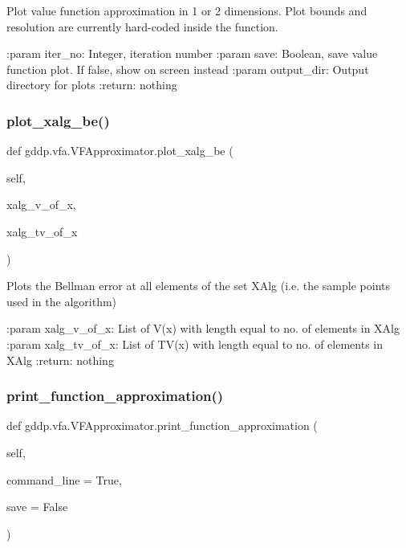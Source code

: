 \begin{DoxyVerb}Plot value function approximation in 1 or 2 dimensions. Plot bounds and resolution are
currently hard-coded inside the function.

:param iter_no: Integer, iteration number
:param save: Boolean, save value function plot. If false, show on screen instead
:param output_dir: Output directory for plots
:return: nothing
\end{DoxyVerb}
 \mbox{\label{classgddp_1_1vfa_1_1_v_f_approximator_a47860c0b82526ed12ecca7f058aaaa03}} 
\subsubsection{\texorpdfstring{plot\_xalg\_be()}{plot\_xalg\_be()}}
{\footnotesize\ttfamily def gddp.\+vfa.\+V\+F\+Approximator.\+plot\+\_\+xalg\+\_\+be (\begin{DoxyParamCaption}\item[{}]{self,  }\item[{}]{xalg\+\_\+v\+\_\+of\+\_\+x,  }\item[{}]{xalg\+\_\+tv\+\_\+of\+\_\+x }\end{DoxyParamCaption})}

\begin{DoxyVerb}Plots the Bellman error at all elements of the set XAlg (i.e. the sample points used in
the algorithm)

:param xalg_v_of_x: List of V(x) with length equal to no. of elements in XAlg
:param xalg_tv_of_x: List of TV(x) with length equal to no. of elements in XAlg
:return: nothing
\end{DoxyVerb}
 \mbox{\label{classgddp_1_1vfa_1_1_v_f_approximator_a6e8aef44abde4c6a1d2bce5474296143}} 
\subsubsection{\texorpdfstring{print\_function\_approximation()}{print\_function\_approximation()}}
{\footnotesize\ttfamily def gddp.\+vfa.\+V\+F\+Approximator.\+print\+\_\+function\+\_\+approximation (\begin{DoxyParamCaption}\item[{}]{self,  }\item[{}]{command\+\_\+line = {\ttfamily True},  }\item[{}]{save = {\ttfamily False} }\end{DoxyParamCaption})}

